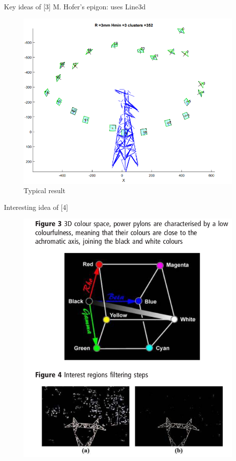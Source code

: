 \documentclass{beamer}
\begin{document}
\begin{frame}[t, fragile]{Key ideas of [3]}
M. Hofer's epigon: uses Line3d

\begin{figure}
\centering
\includegraphics[scale=0.25]{morrarjee}
\captionsetup{labelformat=empty}
\caption{Typical result}
\end{figure}
\end{frame}

\begin{frame}[t, fragile]{Interesting idea of [4]}
\begin{figure}
\centering
\includegraphics[scale=0.23]{colorful}
\end{figure}
\end{frame}
\end{document}
